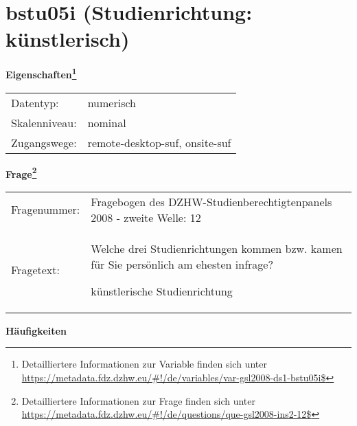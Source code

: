 
    \setcounter{footnote}{0}

    \vspace*{-1.8cm}
	\section{bstu05i (Studienrichtung: künstlerisch)}
	\label{section:bstu05i}



    \vspace*{0.5cm}
    \noindent\textbf{Eigenschaften\footnote{Detailliertere Informationen zur Variable finden sich unter
		\url{https://metadata.fdz.dzhw.eu/\#!/de/variables/var-gsl2008-ds1-bstu05i$}}}\\
	\begin{tabularx}{\hsize}{@{}lX}
	Datentyp: & numerisch \\
	Skalenniveau: & nominal \\
	Zugangswege: &
	  remote-desktop-suf, 
	  onsite-suf
 \\
    \end{tabularx}



				\vspace*{0.5cm}
                \noindent\textbf{Frage\footnote{Detailliertere Informationen zur Frage finden sich unter
		              \url{https://metadata.fdz.dzhw.eu/\#!/de/questions/que-gsl2008-ins2-12$}}}\\
				\begin{tabularx}{\hsize}{@{}lX}
					Fragenummer: &
					  Fragebogen des DZHW-Studienberechtigtenpanels 2008 - zweite Welle:
					  12
 \\
					Fragetext: & Welche drei Studienrichtungen kommen bzw. kamen für Sie persönlich am ehesten infrage?\par  künstlerische Studienrichtung \\
				\end{tabularx}





        		\vspace*{0.5cm}
                \noindent\textbf{Häufigkeiten}

